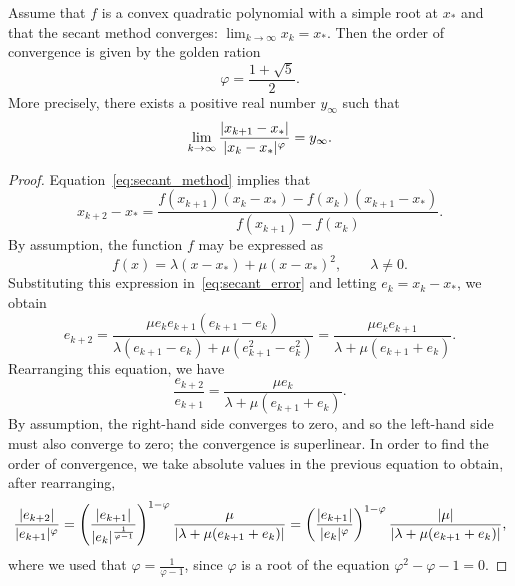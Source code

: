 \begin{theorem}
    Assume that $f$ is a convex quadratic polynomial with a simple root at $x_*$
    and that the secant method converges: $\lim_{k\to \infty} x_k = x_*$.
    Then the order of convergence is given by the golden ration
    \[
        \varphi = \frac{1 + \sqrt{5}}{2}.
    \]
    More precisely, there exists a positive real number $y_{\infty}$ such that
    \begin{equation}
        \label{eq:convergence_secant}
        \lim_{k \to \infty} \frac{\lvert x_{k+1} - x_*\rvert}{\lvert x_{k} - x_*\rvert^{\varphi}} = y_{\infty}.
    \end{equation}
\end{theorem}
\begin{proof}
    Equation~\eqref{eq:secant_method} implies that
    \begin{equation*}
        \label{eq:secant_error}
        x_{k+2} - x_* = \frac{f(x_{k+1}) (x_k - x_*) - f(x_k) (x_{k+1}-x_*)}{f(x_{k+1}) - f(x_k)}.
    \end{equation*}
    By assumption, the function $f$ may be expressed as
    \[
        f(x) = \lambda (x - x_*) + \mu (x - x_*)^2, \qquad \lambda \neq 0.
    \]
    Substituting this expression in~\eqref{eq:secant_error} and letting $e_k = x_k - x_*$,
    we obtain
    \[
        e_{k+2}
        = \frac{\mu e_k e_{k+1} (e_{k+1} - e_{k})}{\lambda (e_{k+1} - e_k) + \mu (e_{k+1}^2 - e_k^2)}
        = \frac{\mu e_k e_{k+1}}{\lambda + \mu (e_{k+1} + e_k)}.
    \]
    Rearranging this equation,
    we have
    \begin{equation}
        \label{eq:secant_method_rearranged}
        \frac{e_{k+2}}{e_{k+1}}
        = \frac{\mu e_k}{\lambda + \mu (e_{k+1} + e_k)}.
    \end{equation}
    By assumption, the right-hand side converges to zero,
    and so the left-hand side must also converge to zero;
    the convergence is superlinear.
    In order to find the order of convergence,
    we take absolute values in the previous equation to obtain,
    after rearranging,
    \[
        \frac{\lvert e_{k+2}\rvert}{\lvert e_{k+1}\rvert^{\varphi}}
        =  \left( \frac{\lvert e_{k+1}\rvert}{\lvert e_{k}\rvert^{\frac{1}{\varphi -1}}}  \right)^{1 - \varphi} \frac{\mu}{\lvert\lambda + \mu (e_{k+1} + e_k)\rvert}
        =  \left( \frac{\lvert e_{k+1}\rvert}{\lvert e_{k}\rvert^{\varphi}}  \right)^{1 - \varphi} \frac{\lvert\mu\rvert}{\lvert\lambda + \mu (e_{k+1} + e_k)\rvert},
    \]
    where we used that $\varphi = \frac{1}{\varphi- 1}$,
    since $\varphi$ is a root of the equation $\varphi^2 - \varphi - 1 = 0$.

\end{proof}
